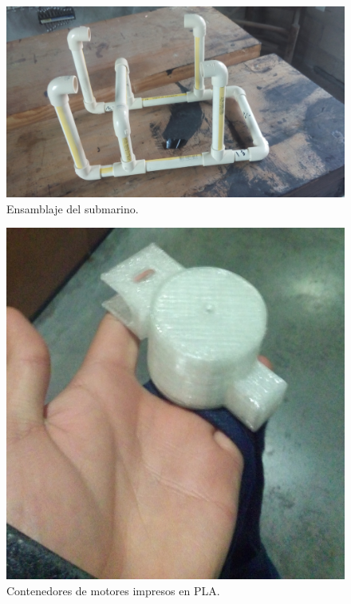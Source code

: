   \begin{figure}[!htbp]
 \centering
 \includegraphics [scale=0.1]
 {./img/20160327_151125.jpg}
 \caption{Ensamblaje del submarino.}
 \end{figure}

 \pagebreak

 \begin{figure}[!htbp]
 \centering
 \includegraphics [scale=0.1]
 {./img/20160429_205804.jpg}
 \caption{Contenedores de motores impresos en PLA.}
 \end{figure}

